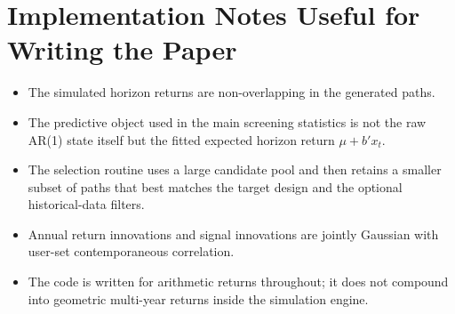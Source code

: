 \documentclass[11pt]{article}
\begin{document}
\section*{Implementation Notes Useful for Writing the Paper}
\begin{itemize}
\item The simulated horizon returns are non-overlapping in the generated paths.
\item The predictive object used in the main screening statistics is not the raw AR(1) state itself but the fitted expected horizon return \(\mu + b' x_t\).
\item The selection routine uses a large candidate pool and then retains a smaller subset of paths that best matches the target design and the optional historical-data filters.
\item Annual return innovations and signal innovations are jointly Gaussian with user-set contemporaneous correlation.
\item The code is written for arithmetic returns throughout; it does not compound into geometric multi-year returns inside the simulation engine.
\end{itemize}
\end{document}
